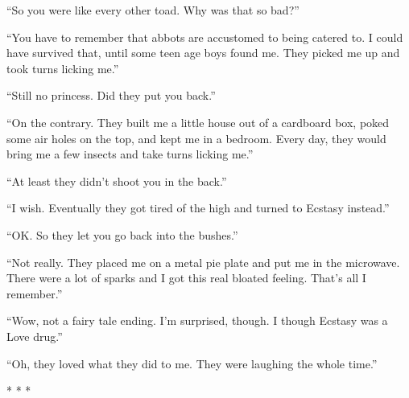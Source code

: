 ``So you were like every other toad. Why was that so bad?''

``You have to remember that abbots are accustomed to being catered to. I could have survived that, until some teen age boys found me. They picked me up and took turns licking me.''

``Still no princess. Did they put you back.''

``On the contrary. They built me a little house out of a cardboard box, poked some air holes on the top, and kept me in a bedroom. Every day, they would bring me a few insects and take turns licking me.''

``At least they didn't shoot you in the back.''

``I wish. Eventually they got tired of the high and turned to Ecstasy instead.''

``OK. So they let you go back into the bushes.''

``Not really. They placed me on a metal pie plate and put me in the microwave. There were a lot of sparks and I got this real bloated feeling. That's all I remember.''

``Wow, not a fairy tale ending. I'm surprised, though. I though Ecstasy was a Love drug.''

``Oh, they loved what they did to me. They were laughing the whole time.''


\begin{center}* * *\end{center}

